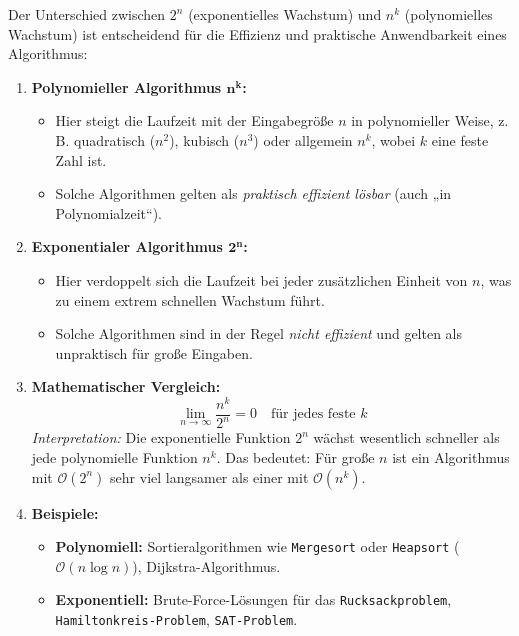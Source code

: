 \documentclass{article}
\begin{document}
Der Unterschied zwischen \( 2^n \) (exponentielles Wachstum) und \( n^k \) (polynomielles Wachstum) ist entscheidend für die Effizienz und praktische Anwendbarkeit eines Algorithmus:

\begin{enumerate}
	\item \textbf{Polynomieller Algorithmus \( \boldsymbol{n^k} \):}
	\begin{itemize}
		\item Hier steigt die Laufzeit mit der Eingabegröße \( n \) in polynomieller Weise, z.\,B. quadratisch (\( n^2 \)), kubisch (\( n^3 \)) oder allgemein \( n^k \), wobei \( k \) eine feste Zahl ist.
		\item Solche Algorithmen gelten als \emph{praktisch effizient lösbar} (auch „in Polynomialzeit“).
	\end{itemize}
	
	\item \textbf{Exponentialer Algorithmus \( \boldsymbol{2^n} \):}
	\begin{itemize}
		\item Hier verdoppelt sich die Laufzeit bei jeder zusätzlichen Einheit von \( n \), was zu einem extrem schnellen Wachstum führt.
		\item Solche Algorithmen sind in der Regel \emph{nicht effizient} und gelten als unpraktisch für große Eingaben.
	\end{itemize}
	
	\item \textbf{Mathematischer Vergleich:}
	\[
	\lim_{n \to \infty} \frac{n^k}{2^n} = 0 \quad \text{für jedes feste } k
	\]
	\textit{Interpretation:} Die exponentielle Funktion \( 2^n \) wächst wesentlich schneller als jede polynomielle Funktion \( n^k \). Das bedeutet: Für große \( n \) ist ein Algorithmus mit \( \mathcal{O}(2^n) \) sehr viel langsamer als einer mit \( \mathcal{O}(n^k) \).
	
	\item \textbf{Beispiele:}
	\begin{itemize}
		\item \textbf{Polynomiell:} Sortieralgorithmen wie \texttt{Mergesort} oder \texttt{Heapsort} (\( \mathcal{O}(n \log n) \)), Dijkstra-Algorithmus.
		\item \textbf{Exponentiell:} Brute-Force-Lösungen für das \texttt{Rucksackproblem}, \texttt{Hamiltonkreis-Problem}, \texttt{SAT-Problem}.
	\end{itemize}
\end{enumerate}
\end{document}
